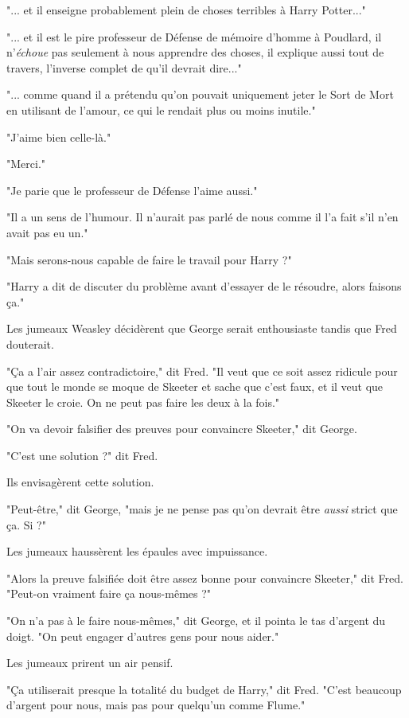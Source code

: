 "... et il enseigne probablement plein de choses terribles à Harry Potter..."

"... et il est le pire professeur de Défense de mémoire d'homme à Poudlard, il n'\emph{échoue} pas seulement à nous apprendre des choses, il explique aussi tout de travers, l'inverse complet de qu'il devrait dire..."

"... comme quand il a prétendu qu'on pouvait uniquement jeter le Sort de Mort en utilisant de l'amour, ce qui le rendait plus ou moins inutile."

"J'aime bien celle-là."

"Merci."

"Je parie que le professeur de Défense l'aime aussi."

"Il a un sens de l'humour. Il n'aurait pas parlé de nous comme il l'a fait s'il n'en avait pas eu un."

"Mais serons-nous capable de faire le travail pour Harry ?"

"Harry a dit de discuter du problème avant d'essayer de le résoudre, alors faisons ça."

Les jumeaux Weasley décidèrent que George serait enthousiaste tandis que Fred douterait.

"Ça a l'air assez contradictoire," dit Fred. "Il veut que ce soit assez ridicule pour que tout le monde se moque de Skeeter et sache que c'est faux, et il veut que Skeeter le croie. On ne peut pas faire les deux à la fois."

"On va devoir falsifier des preuves pour convaincre Skeeter," dit George.

"C'est une solution ?" dit Fred.

Ils envisagèrent cette solution.

"Peut-être," dit George, "mais je ne pense pas qu'on devrait être \emph{aussi} strict que ça. Si ?"

Les jumeaux haussèrent les épaules avec impuissance.

"Alors la preuve falsifiée doit être assez bonne pour convaincre Skeeter," dit Fred. "Peut-on vraiment faire ça nous-mêmes ?"

"On n'a pas à le faire nous-mêmes," dit George, et il pointa le tas d'argent du doigt. "On peut engager d'autres gens pour nous aider."

Les jumeaux prirent un air pensif.

"Ça utiliserait presque la totalité du budget de Harry," dit Fred. "C'est beaucoup d'argent pour nous, mais pas pour quelqu'un comme Flume."

